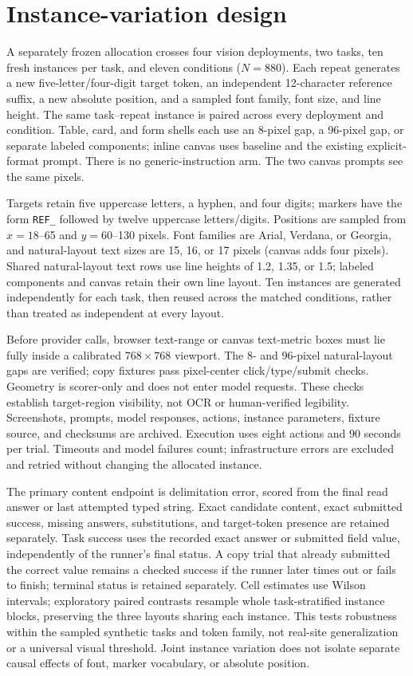 \section{Instance-variation design}
\label{app:instance-variation}
A separately frozen allocation crosses four vision deployments, two tasks, ten fresh instances per task, and eleven conditions ($N=880$). Each repeat generates a new five-letter/four-digit target token, an independent 12-character reference suffix, a new absolute position, and a sampled font family, font size, and line height. The same task--repeat instance is paired across every deployment and condition. Table, card, and form shells each use an 8-pixel gap, a 96-pixel gap, or separate labeled components; inline canvas uses baseline and the existing explicit-format prompt. There is no generic-instruction arm. The two canvas prompts see the same pixels.

Targets retain five uppercase letters, a hyphen, and four digits; markers have the form \texttt{REF\_} followed by twelve uppercase letters/digits. Positions are sampled from $x=18$--65 and $y=60$--130 pixels. Font families are Arial, Verdana, or Georgia, and natural-layout text sizes are 15, 16, or 17 pixels (canvas adds four pixels). Shared natural-layout text rows use line heights of 1.2, 1.35, or 1.5; labeled components and canvas retain their own line layout. Ten instances are generated independently for each task, then reused across the matched conditions, rather than treated as independent at every layout.

Before provider calls, browser text-range or canvas text-metric boxes must lie fully inside a calibrated $768\times768$ viewport. The 8- and 96-pixel natural-layout gaps are verified; copy fixtures pass pixel-center click/type/submit checks. Geometry is scorer-only and does not enter model requests. These checks establish target-region visibility, not OCR or human-verified legibility. Screenshots, prompts, model responses, actions, instance parameters, fixture source, and checksums are archived. Execution uses eight actions and 90 seconds per trial. Timeouts and model failures count; infrastructure errors are excluded and retried without changing the allocated instance.

The primary content endpoint is delimitation error, scored from the final read answer or last attempted typed string. Exact candidate content, exact submitted success, missing answers, substitutions, and target-token presence are retained separately. Task success uses the recorded exact answer or submitted field value, independently of the runner's final status. A copy trial that already submitted the correct value remains a checked success if the runner later times out or fails to finish; terminal status is retained separately. Cell estimates use Wilson intervals; exploratory paired contrasts resample whole task-stratified instance blocks, preserving the three layouts sharing each instance. This tests robustness within the sampled synthetic tasks and token family, not real-site generalization or a universal visual threshold. Joint instance variation does not isolate separate causal effects of font, marker vocabulary, or absolute position.

